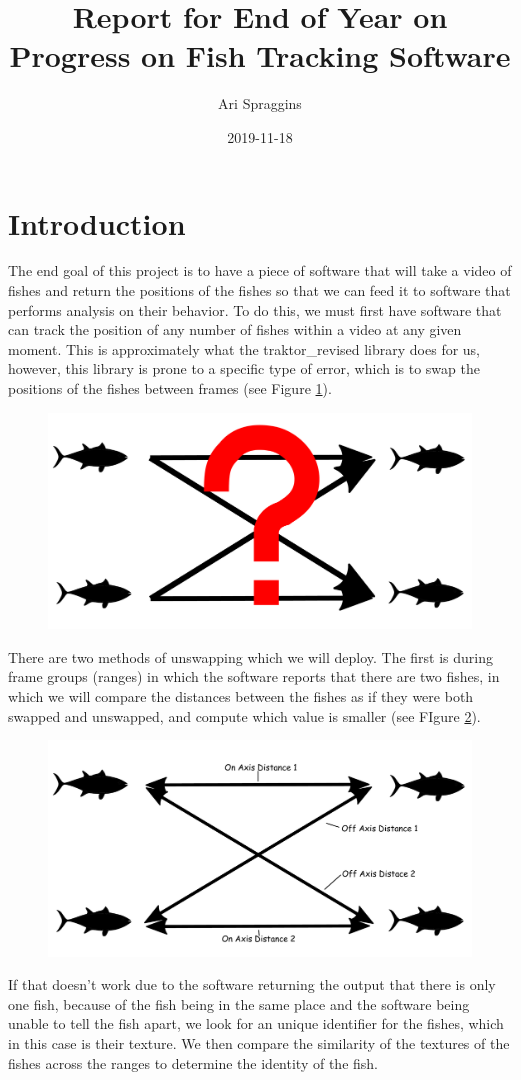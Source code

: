 \documentclass[12pt]{article}
\title{Report for End of Year on Progress on Fish Tracking Software}
\author{Ari Spraggins}
\date{2019-11-18}
\begin{document}
\maketitle
{}

\section{Introduction}

The end goal of this project is to have a piece of software that will take a video of fishes and return the positions of the fishes so that we can feed it to software that performs analysis on their behavior. To do this, we must first have software that can track the position of any number of fishes within a video at any given moment. This is approximately what the traktor\_revised library does for us, however, this library is prone to a specific type of error, which is to swap the positions of the fishes between frames (see Figure \ref{fig:swap_sketch}).
\begin{figure}[h] 
	\centering
	\includegraphics[width=.5\textwidth]{fish1}
	\caption{}
	\label{fig:swap_sketch}
\end{figure}
There are two methods of unswapping which we will deploy. The first is during frame groups (ranges) in which the software reports that there are two fishes, in which we will compare the distances between the fishes as if they were both swapped and unswapped, and compute which value is smaller (see FIgure \ref{fig:axis_sketch}).
\begin{figure}[h] 
	\centering
	\includegraphics[width=.5\textwidth]{fish2}
	\caption{}
	\label{fig:axis_sketch}
\end{figure}
If that doesn't work due to the software returning the output that there is only one fish, because of the fish being in the same place and the software being unable to tell the fish apart, we look for an unique identifier for the fishes, which in this case is their texture. We then compare the similarity of the textures of the fishes across the ranges to determine the identity of the fish. \par
\end{document}
